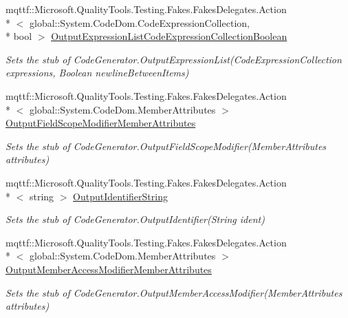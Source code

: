\begin{DoxyCompactItemize}
mqttf\-::\-Microsoft.\-Quality\-Tools.\-Testing.\-Fakes.\-Fakes\-Delegates.\-Action\\*
$<$ global\-::\-System.\-Code\-Dom.\-Code\-Expression\-Collection, \\*
bool $>$ \hyperlink{class_system_1_1_code_dom_1_1_compiler_1_1_fakes_1_1_stub_code_generator_a5fbd85a502e089da92e9d33ee84b2e33}{Output\-Expression\-List\-Code\-Expression\-Collection\-Boolean}
\begin{DoxyCompactList}\small\item\em Sets the stub of Code\-Generator.\-Output\-Expression\-List(\-Code\-Expression\-Collection expressions, Boolean newline\-Between\-Items)\end{DoxyCompactList}\item 
mqttf\-::\-Microsoft.\-Quality\-Tools.\-Testing.\-Fakes.\-Fakes\-Delegates.\-Action\\*
$<$ global\-::\-System.\-Code\-Dom.\-Member\-Attributes $>$ \hyperlink{class_system_1_1_code_dom_1_1_compiler_1_1_fakes_1_1_stub_code_generator_a9ddb9885e6776bd318e3784feaf9d912}{Output\-Field\-Scope\-Modifier\-Member\-Attributes}
\begin{DoxyCompactList}\small\item\em Sets the stub of Code\-Generator.\-Output\-Field\-Scope\-Modifier(\-Member\-Attributes attributes)\end{DoxyCompactList}\item 
mqttf\-::\-Microsoft.\-Quality\-Tools.\-Testing.\-Fakes.\-Fakes\-Delegates.\-Action\\*
$<$ string $>$ \hyperlink{class_system_1_1_code_dom_1_1_compiler_1_1_fakes_1_1_stub_code_generator_a606c67f51b40104484e70949ddd23e24}{Output\-Identifier\-String}
\begin{DoxyCompactList}\small\item\em Sets the stub of Code\-Generator.\-Output\-Identifier(\-String ident)\end{DoxyCompactList}\item 
mqttf\-::\-Microsoft.\-Quality\-Tools.\-Testing.\-Fakes.\-Fakes\-Delegates.\-Action\\*
$<$ global\-::\-System.\-Code\-Dom.\-Member\-Attributes $>$ \hyperlink{class_system_1_1_code_dom_1_1_compiler_1_1_fakes_1_1_stub_code_generator_a6918a6fab15e34f64088b80f518770aa}{Output\-Member\-Access\-Modifier\-Member\-Attributes}
\begin{DoxyCompactList}\small\item\em Sets the stub of Code\-Generator.\-Output\-Member\-Access\-Modifier(\-Member\-Attributes attributes)\end{DoxyCompactList}\item 

\end{DoxyCompactItemize}
